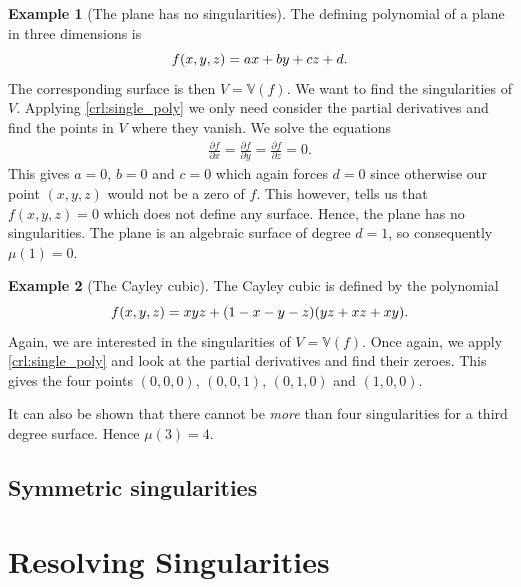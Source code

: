 \documentclass{article}
\theoremstyle{definition}
\newtheorem{example}{Example}
\newcommand{\V}{\mathbb{V}}
\begin{document}
\begin{example}[The plane has no singularities]
    The defining polynomial of a plane in three dimensions is 
    \begin{equation}
        \notag
        f(x, y, z) = ax + by + cz + d.
    \end{equation}
    The corresponding surface is then $V = \V(f)$. We want to find the
    singularities of $V$. Applying \cref{crl:single_poly} we only need consider
    the partial derivatives and find the points in $V$ where they vanish. We
    solve the equations
    \begin{align*}
        \frac{\partial f}{\partial x} = \frac{\partial f}{\partial y} = \frac{\partial f}{\partial z} = 0.
    \end{align*} 
    This gives $a = 0$, $b = 0$ and $c = 0$ which again forces $d = 0$ since
    otherwise our point $(x, y, z)$ would not be a zero of $f$. This however,
    tells us that $f(x, y, z) = 0$ which does not define any surface. Hence,
    the plane has no singularities. The plane is an algebraic surface of degree
    $d = 1$, so consequently $\mu(1) = 0$.
\end{example}

\begin{example}[The Cayley cubic]
    The Cayley cubic is defined by the polynomial
    \begin{equation}
        \notag
        f(x, y, z) = xyz + (1 - x - y - z)(yz + xz + xy).
    \end{equation}
    Again, we are interested in the singularities of $V = \V(f)$. Once again,
    we apply \cref{crl:single_poly} and look at the partial derivatives and
    find their zeroes. This gives the four points $(0, 0, 0)$, $(0, 0, 1)$,
    $(0, 1, 0)$ and $(1, 0, 0)$.

    It can also be shown that there cannot be \emph{more} than four
    singularities for a third degree surface. Hence $\mu(3) = 4$.
\end{example}

\subsection{Symmetric singularities}
\label{sub:symmetric_singularities}


\section{Resolving Singularities}
\label{sec:resolving_singularities}
\end{document}
